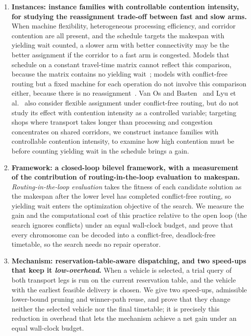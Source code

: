 \documentclass[manuscript,screen,review]{acmart}
\begin{document}
\begin{enumerate}[leftmargin=*]

\item \textbf{Instances: instance families with controllable contention intensity, for studying the reassignment trade-off between fast and slow arms.} When machine flexibility, heterogeneous processing efficiency, and corridor contention are all present, and the schedule targets the makespan with yielding wait counted, a slower arm with better connectivity may be the better assignment if the corridor to a fast arm is congested.
Models that schedule on a constant travel-time matrix cannot reflect this comparison, because the matrix contains no yielding wait~\cite{sun2023integrated};
models with conflict-free routing but a fixed machine for each operation do not involve this comparison either, because there is no reassignment~\cite{li2026framework}.
Van Os and Basten~\cite{vanos2026exact} and Lyu et al.~\cite{lyu2019approach} also consider flexible assignment under conflict-free routing, but do not study its effect with contention intensity as a controlled variable; targeting shops where transport takes longer than processing and congestion concentrates on shared corridors, we construct instance families with controllable contention intensity, to examine how high contention must be before counting yielding wait in the schedule brings a gain.

\item \textbf{Framework: a closed-loop bilevel framework, with a measurement of the contribution of routing-in-the-loop evaluation to makespan.} \emph{Routing-in-the-loop evaluation} takes the fitness of each candidate solution as the makespan after the lower level has completed conflict-free routing, so yielding wait enters the optimization objective of the search.
We measure the gain and the computational cost of this practice relative to the open loop (the search ignores conflicts) under an equal wall-clock budget, and prove that every chromosome can be decoded into a conflict-free, deadlock-free timetable, so the search needs no repair operator.

\item \textbf{Mechanism: reservation-table-aware dispatching, and two speed-ups that keep it \emph{low-overhead}.} When a vehicle is selected, a trial query of both transport legs is run on the current reservation table, and the vehicle with the earliest feasible delivery is chosen.
We give two speed-ups, admissible lower-bound pruning and winner-path reuse, and prove that they change neither the selected vehicle nor the final timetable; it is precisely this reduction in overhead that lets the mechanism achieve a net gain under an equal wall-clock budget.


\end{enumerate}
\end{document}
